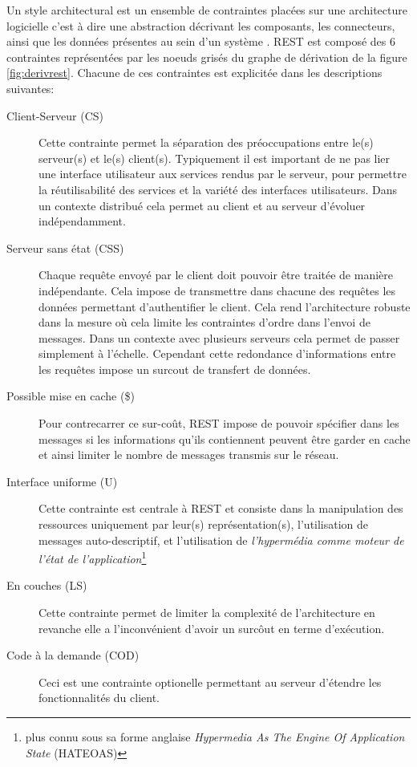 \documentclass[a4paper, 11pt]{report}
\begin{document}
Un style architectural est un ensemble de contraintes placées sur une
architecture logicielle c'est à dire une abstraction décrivant les
composants, les connecteurs, ainsi que les données présentes au sein
d'un système \cite{perry1992foundations}. REST est composé des 6
contraintes représentées par les noeuds grisés du graphe de dérivation
de la figure \ref{fig:derivrest}. Chacune de ces contraintes est
explicitée dans les descriptions suivantes:

\begin{description}
\item[Client-Serveur (CS)] Cette contrainte permet la séparation des
  préoccupations entre le(s) serveur(s) et le(s) client(s).
  Typiquement il est important de ne pas lier une interface
  utilisateur aux services rendus par le serveur, pour permettre la
  réutilisabilité des services et la variété des interfaces
  utilisateurs. Dans un contexte distribué cela permet au client et
  au serveur d'évoluer indépendamment.

\item[Serveur sans état (CSS)] Chaque requête envoyé par le client
  doit pouvoir être traitée de manière indépendante. Cela impose de
  transmettre dans chacune des requêtes les données permettant
  d'authentifier le client. Cela rend l'architecture robuste dans la
  mesure où cela limite les contraintes d'ordre dans l'envoi de
  messages. Dans un contexte avec plusieurs serveurs cela permet de
  passer simplement à l'échelle. Cependant cette redondance
  d'informations entre les requêtes impose un surcout de transfert de
  données.

\item [Possible mise en cache (\$)] Pour contrecarrer ce sur-coût,
  REST impose de pouvoir spécifier dans les messages si les
  informations qu'ils contiennent peuvent être garder en cache et
  ainsi limiter le nombre de messages transmis sur le réseau.

\item[Interface uniforme (U)] Cette contrainte est centrale à REST et
  consiste dans la manipulation des ressources uniquement par leur(s)
  représentation(s), l'utilisation de messages auto-descriptif, et
  l'utilisation de \emph{l'hypermédia comme moteur de l'état de
    l'application}\footnote{plus connu sous sa forme anglaise
    \emph{Hypermedia As The Engine Of Application State} (HATEOAS)}

\item[En couches (LS)] Cette contrainte permet de limiter la
  complexité de l'architecture en revanche elle a l'inconvénient
  d'avoir un surcôut en terme d'exécution.

\item[Code à la demande (COD)] Ceci est une contrainte optionelle
  permettant au serveur d'étendre les fonctionnalités du client.
\end{description}
\end{document}
